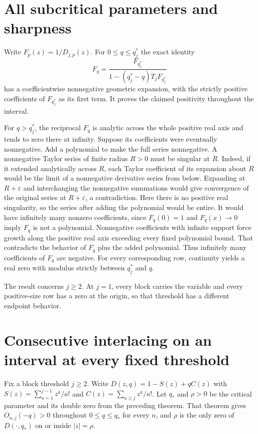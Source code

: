 \documentclass[11pt]{article}
\begin{document}
\section{All subcritical parameters and sharpness}

Write $F_p(z)=1/D_{j,p}(z)$. For $0\le q\le q_j^*$ the exact identity
\[
F_q=\frac{F_{q_j^*}}{1-(q_j^*-q)T_jF_{q_j^*}}
\]
has a coefficientwise nonnegative geometric expansion, with the strictly positive coefficients of $F_{q_j^*}$ as its first term. It proves the claimed positivity throughout the interval.

For $q>q_j^*$, the reciprocal $F_q$ is analytic across the whole positive real axis and tends to zero there at infinity. Suppose its coefficients were eventually nonnegative. Add a polynomial to make the full series nonnegative. A nonnegative Taylor series of finite radius $R>0$ must be singular at $R$. Indeed, if it extended analytically across $R$, each Taylor coefficient of its expansion about $R$ would be the limit of a nonnegative derivative series from below. Expanding at $R+\varepsilon$ and interchanging the nonnegative summations would give convergence of the original series at $R+\varepsilon$, a contradiction. Here there is no positive real singularity, so the series after adding the polynomial would be entire. It would have infinitely many nonzero coefficients, since $F_q(0)=1$ and $F_q(x)\to0$ imply $F_q$ is not a polynomial. Nonnegative coefficients with infinite support force growth along the positive real axis exceeding every fixed polynomial bound. That contradicts the behavior of $F_q$ plus the added polynomial. Thus infinitely many coefficients of $F_q$ are negative. For every corresponding row, continuity yields a real zero with modulus strictly between $q_j^*$ and $q$.

The result concerns $j\ge2$. At $j=1$, every block carries the variable and every positive-size row has a zero at the origin, so that threshold has a different endpoint behavior.

\section{Consecutive interlacing on an interval at every fixed threshold}

Fix a block threshold $j\ge2$. Write $D(z,q)=1-S(z)+qC(z)$ with $S(z)=\sum_{a=1}^{j-1}z^a/a!$ and $C(z)=\sum_{a\ge j}z^a/a!$. Let $q_*$ and $\rho>0$ be the critical parameter and its double zero from the preceding theorem. That theorem gives $O_{n,j}(-q)>0$ throughout $0\le q\le q_*$ for every $n$, and $\rho$ is the only zero of $D(\cdot,q_*)$ on or inside $|z|=\rho$.
\end{document}
